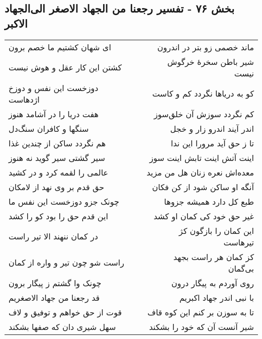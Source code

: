 \begin{center}
\section*{بخش ۷۶ - تفسیر رجعنا من الجهاد الاصغر الی‌الجهاد الاکبر}
\label{sec:sh076}
\begin{longtable}{l p{0.5cm} r}
ای شهان کشتیم ما خصم برون
&&
ماند خصمی زو بتر در اندرون
\\
کشتن این کار عقل و هوش نیست
&&
شیر باطن سخرهٔ خرگوش نیست
\\
دوزخست این نفس و دوزخ اژدهاست
&&
کو به دریاها نگردد کم و کاست
\\
هفت دریا را در آشامد هنوز
&&
کم نگردد سوزش آن خلق‌سوز
\\
سنگها و کافران سنگ‌دل
&&
اندر آیند اندرو زار و خجل
\\
هم نگردد ساکن از چندین غذا
&&
تا ز حق آید مرورا این ندا
\\
سیر گشتی سیر گوید نه هنوز
&&
اینت آتش اینت تابش اینت سوز
\\
عالمی را لقمه کرد و در کشید
&&
معده‌اش نعره زنان هل من مزید
\\
حق قدم بر وی نهد از لامکان
&&
آنگه او ساکن شود از کن فکان
\\
چونک جزو دوزخست این نفس ما
&&
طبع کل دارد همیشه جزوها
\\
این قدم حق را بود کو را کشد
&&
غیر حق خود کی کمان او کشد
\\
در کمان ننهند الا تیر راست
&&
این کمان را بازگون کژ تیرهاست
\\
راست شو چون تیر و واره از کمان
&&
کز کمان هر راست بجهد بی‌گمان
\\
چونک وا گشتم ز پیگار برون
&&
روی آوردم به پیگار درون
\\
قد رجعنا من جهاد الاصغریم
&&
با نبی اندر جهاد اکبریم
\\
قوت از حق خواهم و توفیق و لاف
&&
تا به سوزن بر کنم این کوه قاف
\\
سهل شیری دان که صفها بشکند
&&
شیر آنست آن که خود را بشکند
\\
\end{longtable}
\end{center}
